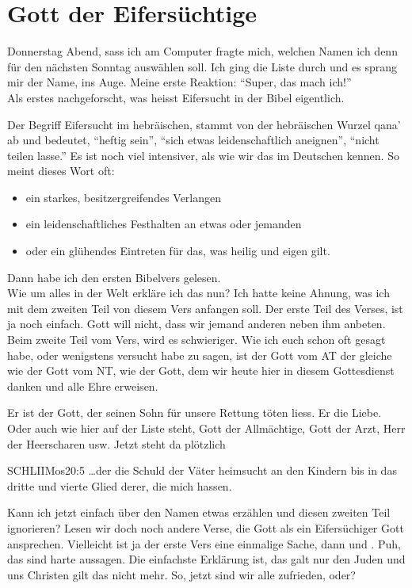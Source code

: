 \section{Gott der Eifersüchtige}
\begin{otsblock}[Einführung]
    Donnerstag Abend, sass ich am Computer fragte mich, welchen Namen ich denn für den nächsten Sonntag auswählen soll. Ich ging die Liste durch und es sprang mir der Name,  ins Auge. Meine erste Reaktion: \enquote{Super, das mach ich!} \\
    Als erstes nachgeforscht, was heisst Eifersucht in der Bibel eigentlich.

    Der Begriff Eifersucht im hebräischen, stammt von der hebräischen Wurzel qana' ab und bedeutet, \enquote{heftig sein}, \enquote{sich etwas leidenschaftlich aneignen}, \enquote{nicht teilen lasse.} Es ist noch viel intensiver, als wie wir das im Deutschen kennen.
    So meint dieses Wort oft:
    \begin{itemize}
        \item ein starkes, besitzergreifendes Verlangen
        \item ein leidenschaftliches Festhalten an etwas oder jemanden
        \item oder ein glühendes Eintreten für das, was heilig und eigen gilt.
    \end{itemize}
    
    Dann habe ich den ersten Bibelvers  gelesen.\\
    Wie um alles in der Welt erkläre ich das nun? Ich hatte keine Ahnung, was ich mit dem zweiten Teil von diesem Vers anfangen soll. Der erste Teil des Verses, ist ja noch einfach. Gott will nicht, dass wir jemand anderen neben ihm anbeten. Beim zweite Teil vom Vers, wird es schwieriger. Wie ich euch schon oft gesagt habe, oder wenigstens versucht habe zu sagen, ist der Gott vom AT der gleiche wie der Gott vom NT, wie der Gott, dem wir heute hier in diesem Gottesdienst danken und alle Ehre erweisen.

    Er ist der Gott, der seinen Sohn für unsere Rettung töten liess. Er  die Liebe. Oder auch wie hier auf der Liste steht, Gott der Allmächtige, Gott der Arzt, Herr der Heerscharen usw. Jetzt steht da plötzlich 
    \begin{bibelbox}{SCHL}{IIMos}{20:5}
    \dots der die Schuld der Väter heimsucht an den Kindern bis in das dritte und vierte Glied derer, die mich hassen.
    \end{bibelbox}
    Kann ich jetzt einfach über den Namen  etwas erzählen und diesen zweiten Teil ignorieren? Lesen wir doch noch andere Verse, die Gott als ein Eifersüchiger Gott ansprechen. Vielleicht ist ja der erste Vers eine einmalige Sache,
     dann  und . Puh, das sind harte aussagen. Die einfachste Erklärung ist, das galt nur den Juden und uns Christen gilt das nicht mehr. So, jetzt sind wir alle zufrieden, oder?


\end{otsblock}
